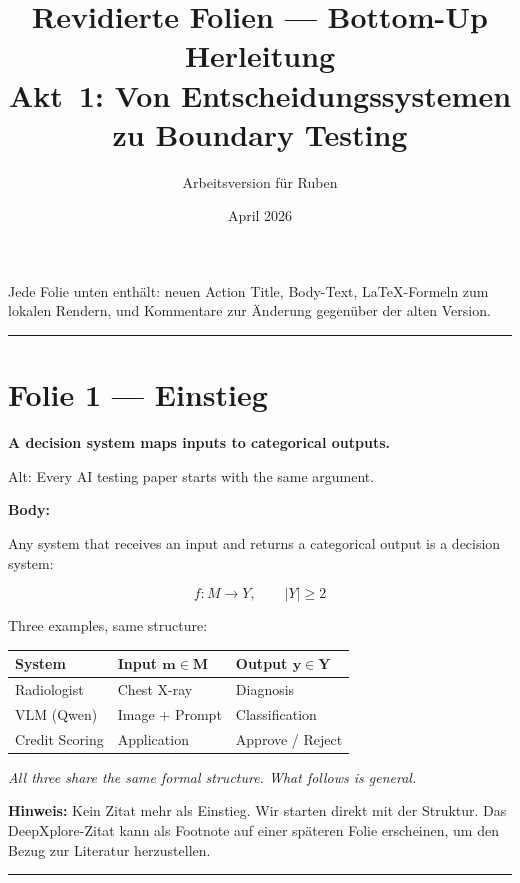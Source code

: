 \documentclass[11pt, a4paper]{article}
\title{Revidierte Folien --- Bottom-Up Herleitung\\[0.3em]
\large Akt~1: Von Entscheidungssystemen zu Boundary Testing}
\author{Arbeitsversion f\"ur Ruben}
\date{April 2026}
\newcommand{\actiontitle}[1]{{\Large\bfseries\color{tumdark} #1}\par\vspace{0.3em}}
\newcommand{\oldtitle}[1]{{\small\color{gray} Alt: #1}\par}
\newcommand{\slidenote}[1]{{\small\color{accent}\textbf{Hinweis:} #1}\par}
\begin{document}
\maketitle

Jede Folie unten enth\"alt: neuen Action Title, Body-Text, LaTeX-Formeln zum lokalen Rendern, und Kommentare zur \"Anderung gegen\"uber der alten Version.

\bigskip
\hrule
\bigskip

\section*{Folie 1 --- Einstieg}

\actiontitle{A decision system maps inputs to categorical outputs.}

\oldtitle{Every AI testing paper starts with the same argument.}

\textbf{Body:}

Any system that receives an input and returns a categorical output is a decision system:
%
\begin{tcolorbox}[colframe=tumblue, colback=white]
\begin{equation}
f \colon M \to Y, \qquad |Y| \geq 2
\end{equation}
\end{tcolorbox}

Three examples, same structure:

\begin{center}
\begin{tabular}{lll}
\textbf{System} & \textbf{Input} $\boldsymbol{m \in M}$ & \textbf{Output} $\boldsymbol{y \in Y}$ \\
\hline
Radiologist & Chest X-ray & Diagnosis \\
VLM (Qwen) & Image + Prompt & Classification \\
Credit Scoring & Application & Approve / Reject \\
\end{tabular}
\end{center}

\textit{All three share the same formal structure. What follows is general.}

\slidenote{Kein Zitat mehr als Einstieg. Wir starten direkt mit der Struktur. Das DeepXplore-Zitat kann als Footnote auf einer sp\"ateren Folie erscheinen, um den Bezug zur Literatur herzustellen.}

\bigskip\hrule\bigskip
\end{document}
